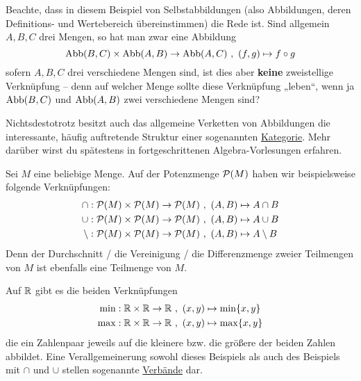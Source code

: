 \begin{bem}[*]
    Beachte, dass in diesem Beispiel von Selbstabbildungen (also Abbildungen, deren Definitions- und Wertebereich übereinstimmen) die Rede ist. Sind allgemein $A,B,C$ drei Mengen, so hat man zwar eine Abbildung
        \[ \Abb(B,C) \times \Abb(A,B) \to \Abb(A,C) \ ,\ (f,g) \mapsto f\circ g \]
    sofern $A,B,C$ drei verschiedene Mengen sind, ist dies aber \textbf{keine} zweistellige Verknüpfung -- denn auf welcher Menge sollte diese Verknüpfung „leben“, wenn ja $\operatorname{Abb}(B,C)$ und $\operatorname{Abb}(A,B)$ zwei verschiedene Mengen sind?
    
    Nichtsdestotrotz besitzt auch das allgemeine Verketten von Abbildungen die interessante, häufig auftretende Struktur einer sogenannten \href{https://ncatlab.org/nlab/show/category}{Kategorie}. Mehr darüber wirst du spätestens in fortgeschrittenen Algebra-Vorlesungen erfahren.
\end{bem}


\begin{bsp}
    Sei $M$ eine beliebige Menge. Auf der Potenzmenge $\mathcal P(M)$ haben wir beispielsweise folgende Verknüpfungen:
    \begin{align*}
        \cap : \calP(M)\times \calP(M) \to \calP(M) \ & ,\ (A,B)\mapsto A\cap B \\
        \cup : \calP(M)\times \calP(M) \to \calP(M) \ &,\ (A,B)\mapsto A\cup B \\
        \setminus : \calP(M)\times \calP(M) \to \calP(M) \ &,\ (A,B)\mapsto A\setminus B
    \end{align*}
    Denn der Durchschnitt / die Vereinigung / die Differenzmenge zweier Teilmengen von $M$ ist ebenfalls eine Teilmenge von $M$.
\end{bsp}


\begin{bsp} \label{bsp:minmaxverknuepfung}
    Auf $\mathbb R$ gibt es die beiden Verknüpfungen
    \begin{align*}
        \min : \mathbb R\times \mathbb R\to \mathbb R\ &,\ (x,y)\mapsto \min\{x,y\} \\
        \max : \mathbb R\times \mathbb R\to \mathbb R\ &,\ (x,y)\mapsto \max\{x,y\}
    \end{align*}
    die ein Zahlenpaar jeweils auf die kleinere bzw. die größere der beiden Zahlen abbildet. Eine Verallgemeinerung sowohl dieses Beispiels als auch des Beispiels mit $\cap$ und $\cup$ stellen sogenannte \href{https://de.wikipedia.org/wiki/Verband_(Mathematik)}{Verbände} dar.
\end{bsp}


